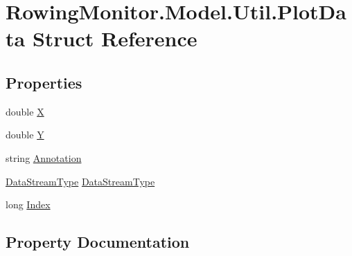 \hypertarget{struct_rowing_monitor_1_1_model_1_1_util_1_1_plot_data}{}\section{Rowing\+Monitor.\+Model.\+Util.\+Plot\+Data Struct Reference}
\label{struct_rowing_monitor_1_1_model_1_1_util_1_1_plot_data}
\subsection*{Properties}
\begin{DoxyCompactItemize}
\item 
double \hyperlink{struct_rowing_monitor_1_1_model_1_1_util_1_1_plot_data_aecf4f967ff34d6f3ff541792a3de2cb2}{X}
\item 
double \hyperlink{struct_rowing_monitor_1_1_model_1_1_util_1_1_plot_data_ad481a32ecc84d09b772a1e7737728e46}{Y}
\item 
string \hyperlink{struct_rowing_monitor_1_1_model_1_1_util_1_1_plot_data_a1ea10a21ea1ba58e32f59a6fe97d3f40}{Annotation}
\item 
\hyperlink{namespace_rowing_monitor_1_1_model_1_1_util_a01e1a06061533b246feb7421c9d0107f}{Data\+Stream\+Type} \hyperlink{struct_rowing_monitor_1_1_model_1_1_util_1_1_plot_data_a774cc0b6b03996964e6bde85b993ca2d}{Data\+Stream\+Type}
\item 
long \hyperlink{struct_rowing_monitor_1_1_model_1_1_util_1_1_plot_data_a77f3f8a73e03f6902a921ced691bd074}{Index}
\end{DoxyCompactItemize}


\subsection{Property Documentation}
\mbox{\label{struct_rowing_monitor_1_1_model_1_1_util_1_1_plot_data_a1ea10a21ea1ba58e32f59a6fe97d3f40}} 
